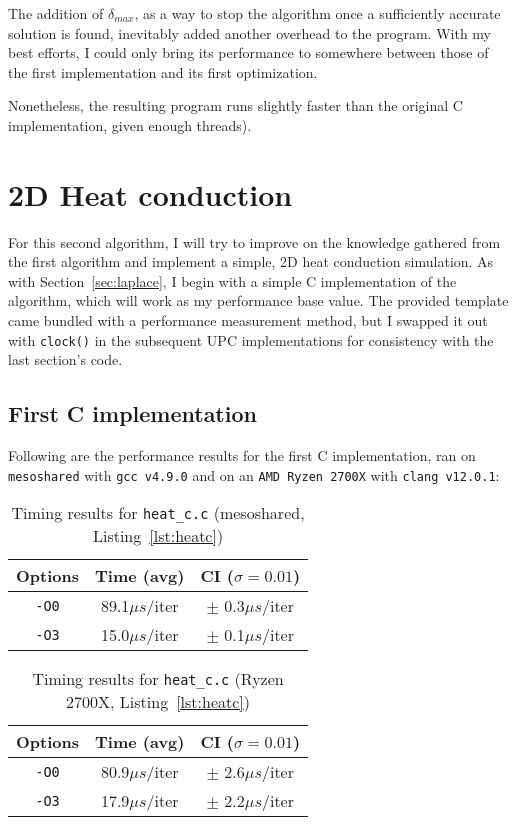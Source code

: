 \documentclass[12pt]{article}
\newcommand{\us}[0]{${\mu}s$}
\begin{document}
The addition of $\delta_{max}$, as a way to stop the algorithm once a sufficiently accurate solution is found, inevitably added another overhead to the program.
With my best efforts, I could only bring its performance to somewhere between those of the first implementation and its first optimization.

Nonetheless, the resulting program runs slightly faster than the original C implementation, given enough threads).

\section{2D Heat conduction}
\label{sec:heat}

For this second algorithm, I will try to improve on the knowledge gathered from the first algorithm and implement a simple, 2D heat conduction simulation.
As with Section~\ref{sec:laplace}, I begin with a simple C implementation of the algorithm, which will work as my performance base value.
The provided template came bundled with a performance measurement method, but I swapped it out with \texttt{clock()} in the subsequent UPC implementations for consistency with the last section's code.

\subsection{First C implementation}

Following are the performance results for the first C implementation, ran on \texttt{mesoshared} with \texttt{gcc v4.9.0} and on an \texttt{AMD Ryzen 2700X} with \texttt{clang v12.0.1}:

\begin{table}[h]
  \centering\begin{tabular}{|c|c|c|}
    \hline
    Options & Time (avg) & CI ($\sigma=0.01$) \\
    \hline
    \texttt{-O0} & 89.1\us/iter & $\pm$ 0.3\us/iter \\
    \texttt{-O3} & 15.0\us/iter & $\pm$ 0.1\us/iter \\
    \hline
  \end{tabular}
  \caption{Timing results for \texttt{heat\_c.c} (mesoshared, Listing~\ref{lst:heatc})}
  \label{tab:heatc}
\end{table}

\begin{table}[h]
  \centering\begin{tabular}{|c|c|c|}
    \hline
    Options & Time (avg) & CI ($\sigma=0.01$) \\
    \hline
    \texttt{-O0} & 80.9\us/iter & $\pm$ 2.6\us/iter \\
    \texttt{-O3} & 17.9\us/iter & $\pm$ 2.2\us/iter \\
    \hline
  \end{tabular}
  \caption{Timing results for \texttt{heat\_c.c} (Ryzen 2700X, Listing~\ref{lst:heatc})}
  \label{tab:heatcr}
\end{table}
\end{document}
